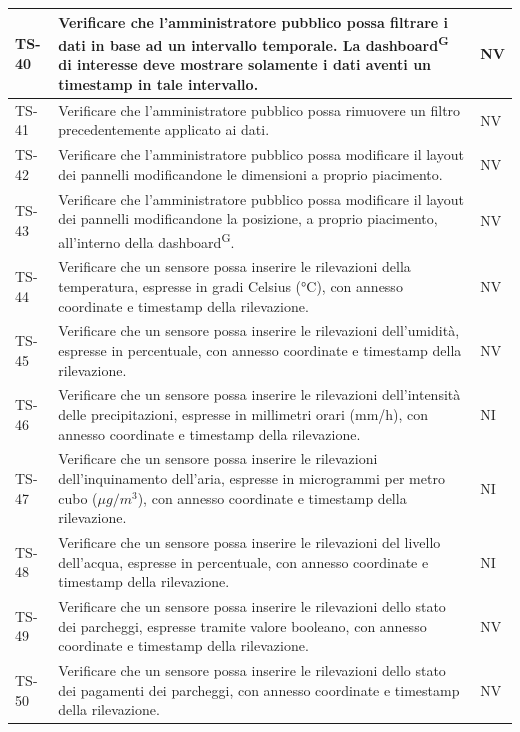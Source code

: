 \documentclass[8pt]{article}
\newcommand{\glossterm}[1]{#1\textsuperscript{G}} %
\begin{document}
\begin{longtable}{|>{\centering}p{2cm}|>{\RaggedRight}m{12cm}|>{\centering\arraybackslash}p{2cm}|}
    \hline
    TS-40 & Verificare che l'amministratore pubblico possa filtrare i dati in base ad un intervallo temporale. La \glossterm{dashboard} di interesse deve mostrare solamente i dati aventi un timestamp in tale intervallo.
    & NV\\
    \hline
    TS-41 & Verificare che l'amministratore pubblico possa rimuovere un filtro precedentemente applicato ai dati.
    & NV\\
    \hline
    TS-42 & Verificare che l'amministratore pubblico possa modificare il layout dei pannelli modificandone le dimensioni a proprio piacimento.
    & NV\\
    \hline
    TS-43 & Verificare che l'amministratore pubblico possa modificare il layout dei pannelli modificandone la posizione, a proprio piacimento, all'interno della \glossterm{dashboard}.
    & NV\\
    \hline
    TS-44 & Verificare che un sensore possa inserire le rilevazioni della temperatura, espresse in
    gradi Celsius (°C), con annesso coordinate e timestamp della rilevazione. & NV \\
    \hline
    TS-45 & Verificare che un sensore possa inserire le rilevazioni dell'umidità, espresse in
    percentuale, con annesso coordinate e timestamp della rilevazione. & NV \\
    \hline
    TS-46 & Verificare che un sensore possa inserire le rilevazioni dell'intensità delle precipitazioni, espresse in
    millimetri orari (mm/h), con annesso coordinate e timestamp della rilevazione. & NI \\
    \hline
    TS-47 & Verificare che un sensore possa inserire le rilevazioni dell'inquinamento dell'aria, espresse in
    microgrammi per metro cubo ($\mu g/m^3$), con annesso coordinate e timestamp della rilevazione. & NI \\
    \hline
    TS-48 & Verificare che un sensore possa inserire le rilevazioni del livello dell'acqua, espresse in
    percentuale, con annesso coordinate e timestamp della rilevazione. & NI \\
    \hline
    TS-49 & Verificare che un sensore possa inserire le rilevazioni dello stato dei parcheggi,
    espresse tramite valore booleano, con annesso coordinate e timestamp della rilevazione. & NV \\
    \hline 
    TS-50 & Verificare che un sensore possa inserire le rilevazioni dello stato dei pagamenti
    dei parcheggi, con annesso coordinate e timestamp della rilevazione. & NV \\

\end{longtable}
\end{document}
